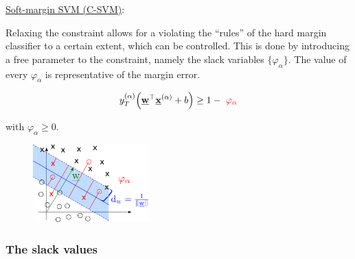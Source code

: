 \begin{frame}\frametitle{\subsecname}

\underline{Soft-margin SVM (C-SVM)}:

Relaxing the constraint allows for a violating the ``rules'' of the hard margin classifier to a certain extent, which can be controlled.
This is done by introducing a free parameter to the constraint, namely the slack variables $\{\varphi_{\alpha}\}$.
The value of every $\varphi_{\alpha}$ is representative of the margin error.

\begin{equation}
y_T^{(\alpha)} \Big( \vec{w}^\top \vec{x}^{(\alpha)} + b \Big)
				\geq 1 -~{\color{red}\varphi_{\alpha}}
\end{equation}

with $\varphi_{\alpha} \ge 0$.

\begin{figure}[h]
	\centering
	\includegraphics[height=3cm]{img/margin_errors}%
    \label{fig:marginsoft}%
\end{figure}

\end{frame}


\subsubsection{The slack values}

